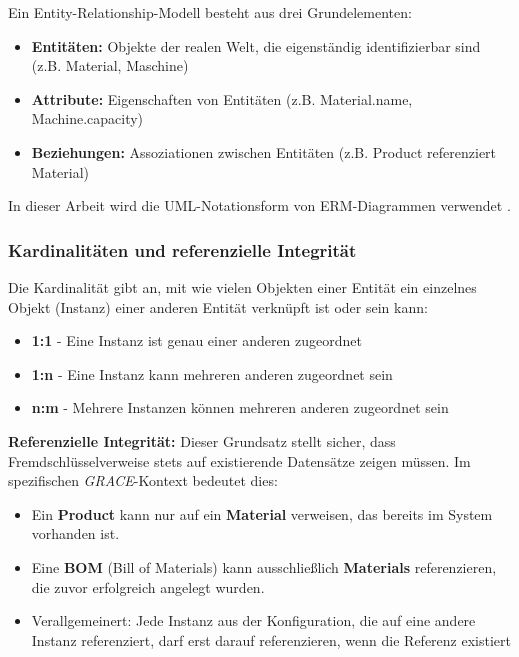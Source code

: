 Ein Entity-Relationship-Modell besteht aus drei Grundelementen:

\begin{itemize}
    \item \textbf{Entitäten:} Objekte der realen Welt, die eigenständig identifizierbar sind (z.B. Material, Maschine)
    \item \textbf{Attribute:} Eigenschaften von Entitäten (z.B. Material.name, Machine.capacity)
    \item \textbf{Beziehungen:} Assoziationen zwischen Entitäten (z.B. \glqq Product referenziert Material\grqq{})
\end{itemize}

\noindent In dieser Arbeit wird die UML-Notationsform von ERM-Diagrammen verwendet \citep{omg:uml2017}.

\subsubsection{Kardinalitäten und referenzielle Integrität}
\label{subsubsec:ERMKardinalitaeten}

Die Kardinalität gibt an, mit wie vielen Objekten einer Entität ein einzelnes Objekt (Instanz) einer anderen Entität verknüpft ist oder sein kann:

\begin{itemize}
    \item \textbf{1:1} - Eine Instanz ist genau einer anderen zugeordnet
    \item \textbf{1:n} - Eine Instanz kann mehreren anderen zugeordnet sein
    \item \textbf{n:m} - Mehrere Instanzen können mehreren anderen zugeordnet sein
\end{itemize}

\noindent\textbf{Referenzielle Integrität:} Dieser Grundsatz stellt sicher, dass Fremdschlüsselverweise stets auf existierende Datensätze zeigen müssen. Im spezifischen \textit{GRACE}-Kontext bedeutet dies:
\begin{itemize}
    \item Ein \textbf{Product} kann nur auf ein \textbf{Material} verweisen, das bereits im System vorhanden ist.
    \item Eine \textbf{BOM} (Bill of Materials) kann ausschließlich \textbf{Materials} referenzieren, die zuvor erfolgreich angelegt wurden.
    \item Verallgemeinert: Jede Instanz aus der Konfiguration, die auf eine andere Instanz referenziert, darf erst darauf referenzieren, wenn die Referenz existiert
\end{itemize}


